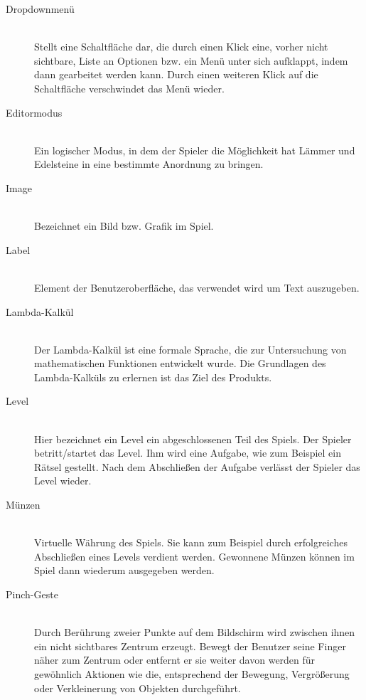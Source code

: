 \begin{description}
	\item[Dropdownmenü] \hfill \\
	Stellt eine Schaltfläche dar, die durch einen Klick eine, vorher nicht sichtbare, Liste an Optionen bzw.
	ein Menü unter sich aufklappt, indem dann gearbeitet werden kann. 
	Durch einen weiteren Klick auf die Schaltfläche verschwindet das Menü wieder.
	
	\item[Editormodus] \hfill \\
	Ein logischer Modus, in dem der Spieler die Möglichkeit hat Lämmer und Edelsteine in eine bestimmte Anordnung zu bringen.
	
	\item[Image] \hfill \\
	Bezeichnet ein Bild bzw. Grafik im Spiel.
	
	\item[Label] \hfill \\
	Element der Benutzeroberfläche, das verwendet wird um Text auszugeben. 
	
	\item[Lambda-Kalkül] \hfill \\
	Der Lambda-Kalkül ist eine formale Sprache, die zur Untersuchung von mathematischen Funktionen entwickelt wurde.
	Die Grundlagen des Lambda-Kalküls zu erlernen ist das Ziel des Produkts.
	
	\item[Level] \hfill \\
	Hier bezeichnet ein Level ein abgeschlossenen Teil des Spiels. Der Spieler betritt/startet das Level. Ihm wird eine Aufgabe,
	wie zum Beispiel ein Rätsel gestellt. Nach dem Abschließen der Aufgabe verlässt der Spieler das Level wieder.
	
	\item[Münzen] \hfill \\
	Virtuelle Währung des Spiels. Sie kann zum Beispiel durch erfolgreiches Abschließen eines Levels verdient werden.
	Gewonnene Münzen können im Spiel dann wiederum ausgegeben werden.
	
	\item[Pinch-Geste] \hfill \\
	Durch Berührung zweier Punkte auf dem Bildschirm wird zwischen ihnen ein nicht sichtbares Zentrum erzeugt.
	Bewegt der Benutzer seine Finger näher zum Zentrum oder entfernt er sie weiter davon werden für gewöhnlich
	Aktionen wie die, entsprechend der Bewegung, Vergrößerung oder Verkleinerung von Objekten durchgeführt.
	

\end{description}
